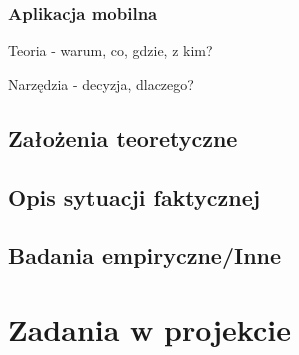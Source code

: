 \documentclass[12pt, a4paper, twoside, openany]{book}
\begin{document}

\subsubsection{Aplikacja mobilna}

Teoria - warum, co, gdzie, z kim?

Narzędzia - decyzja, dlaczego?

\subsection{Założenia teoretyczne}

\subsection{Opis sytuacji faktycznej}

\subsection{Badania empiryczne/Inne}

\section{Zadania w projekcie}

\newpage
\end{document}
